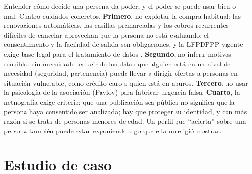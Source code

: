\begin{cajaEtica}
Entender cómo decide una persona da poder, y el poder se puede usar bien o mal.
Cuatro cuidados concretos. \textbf{Primero}, no explotar la compra habitual: las
renovaciones automáticas, las casillas premarcadas y los cobros recurrentes
difíciles de cancelar aprovechan que la persona no está evaluando; el
consentimiento y la facilidad de salida son obligaciones, y la LFPDPPP vigente
exige base legal para el tratamiento de datos \parencite{dof_lfpdppp2025}.
\textbf{Segundo}, no inferir motivos sensibles sin necesidad: deducir de los datos que
alguien está en un nivel de necesidad (seguridad, pertenencia) puede llevar a
dirigir ofertas a personas en situación vulnerable, como crédito caro a quien
está en apuros. \textbf{Tercero}, no usar la psicología de la asociación (Pavlov)
para fabricar urgencia falsa. \textbf{Cuarto}, la netnografía exige criterio:
que una publicación sea pública no significa que la persona haya consentido ser
analizada; hay que proteger su identidad, y con más razón si se trata de
personas menores de edad. Un perfil que \enquote{acierta} sobre una
persona también puede estar exponiendo algo que ella no eligió mostrar.
\end{cajaEtica}

\section{Estudio de caso}
\label{sec:cap09-caso}

